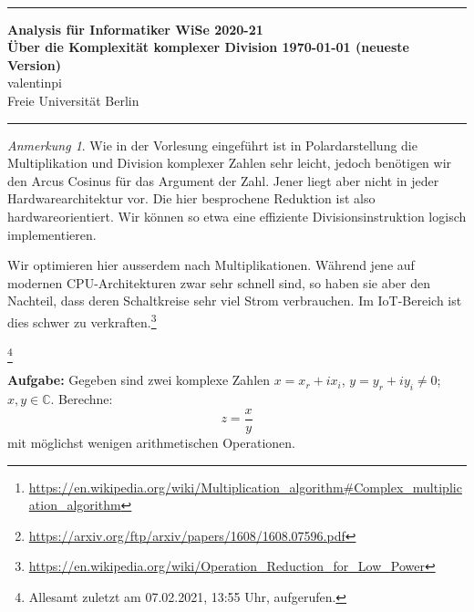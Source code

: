 \documentclass[10pt,fleqn]{article}
\theoremstyle{definition}
\theoremstyle{remark}
\newtheorem*{remark}{Anmerkung}
\newcommand{\Authors}{valentinpi}
\begin{document}
\vspace*{-12ex}
\phantom{}\\
\noindent\rule{\textwidth}{0.1pt}
\large \textbf{Analysis für Informatiker \hfill WiSe 2020-21} \vspace*{0.25cm}\\
\normalsize \textbf{Über die Komplexität komplexer Division \hfill \today { (neueste Version)}}\\
\Authors\\
Freie Universität Berlin\\
\noindent\rule{\textwidth}{0.1pt}

\begin{abstract}
    \noindent Diese Ausarbeitung zeigt die Division komplexer Zahlen in algebraischer Darstellung mithilfe linearer Gleichungssysteme und zeigt eine Reduktion der Komplexität des Algorithmus. Diese ist analog zu der Reduktion der Komplexität komplexer Multiplikation, welche bereits Gauß entdeckt hatte.\footnote{\url{https://en.wikipedia.org/wiki/Multiplication_algorithm\#Complex_multiplication_algorithm}} Die Reduktion selbst wurde von Aleksandr Cariow entdeckt. Hier soll dieses sehr kurze Paper erklärt werden.\footnote{\url{https://arxiv.org/ftp/arxiv/papers/1608/1608.07596.pdf}}
\end{abstract}

\begin{remark}
    Wie in der Vorlesung eingeführt ist in Polardarstellung die Multiplikation und Division komplexer Zahlen sehr leicht, jedoch benötigen wir den Arcus Cosinus für das Argument der Zahl. Jener liegt aber nicht in jeder Hardwarearchitektur vor. Die hier besprochene Reduktion ist also hardwareorientiert. Wir können so etwa eine effiziente Divisionsinstruktion logisch implementieren.

    Wir optimieren hier ausserdem nach Multiplikationen. Während jene auf modernen CPU-Architekturen zwar sehr schnell sind, so haben sie aber den Nachteil, dass deren Schaltkreise sehr viel Strom verbrauchen. Im IoT-Bereich ist dies schwer zu verkraften.\footnote{\url{https://en.wikipedia.org/wiki/Operation_Reduction_for_Low_Power}}
\end{remark}

{
    \let\thefootnote\relax\footnote{Allesamt zuletzt am 07.02.2021, 13:55 Uhr, aufgerufen.}
}

\textbf{Aufgabe:} Gegeben sind zwei komplexe Zahlen \(x = x_r + ix_i\), \(y = y_r + iy_i \neq 0\); \(x, y \in \mathbb{C}\). Berechne:
\[
    z = \frac{x}{y}
\]
mit möglichst wenigen arithmetischen Operationen.
\end{document}
